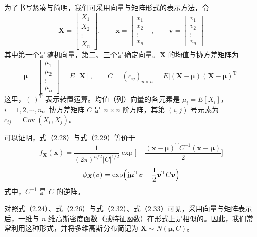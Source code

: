 \documentclass[11pt,openany,UTF8]{ctexbook}
\newcommand{\ju}{\mathrm{j}}                       %
\DeclareMathOperator{\Cov}{Cov}                    %
\newcommand{\bX}{\bm{X}}
\newcommand{\bx}{\bm{x}}
\begin{document}
为了书写紧凑与简明\nobreak，我们可采用向量与矩阵形式的表示方法\nobreak，令
\begin{equation}
\bX=\begin{bmatrix}X_1\\X_2\\\vdots\\X_n\end{bmatrix},\qquad
\bx=\begin{bmatrix}x_1\\x_2\\\vdots\\x_n\end{bmatrix},\qquad
\bm{v}=\begin{bmatrix}v_1\\v_2\\\vdots\\v_n\end{bmatrix}
\label{eq:2.30}
\end{equation}
其中第一个是随机向量\nobreak，第二\nobreak、三个是确定向量\nobreak。$\bX$ 的均值与协方差矩阵为
\begin{equation}
\bm{\mu}=\begin{bmatrix}\mu_1\\\mu_2\\\vdots\\\mu_n\end{bmatrix}=E[\bX],\qquad
C=(c_{ij})_{n\times n}=E\bigl[(\bX-\bm{\mu})(\bX-\bm{\mu})^{\mathrm{T}}\bigr]
\label{eq:2.31}
\end{equation}
这里\nobreak，$(\ )^{\mathrm{T}}$ 表示转置运算\nobreak。均值（列\nobreak）向量的各元素是 $\mu_i=E[X_i]$\nobreak，$i=1,2,\cdots,n$\nobreak。协方差矩阵 $C$ 是 $n\times n$ 阶方阵\nobreak，其第 $(i,j)$ 号元素为 $c_{ij}=\Cov(X_i,X_j)$\nobreak。

可以证明\nobreak，式\nobreak（2.28\nobreak）与式\nobreak（2.29\nobreak）等价于
\begin{equation}
f_{\bX}(\bx)=\frac{1}{(2\pi)^{n/2}\lvert C\rvert^{1/2}}
\exp\Biggl[-\frac{(\bx-\bm{\mu})^{\mathrm{T}}C^{-1}(\bx-\bm{\mu})}{2}\Biggr]
\label{eq:2.32}
\end{equation}
\begin{equation}
\phi_{\bX}(\bm{v})=\exp\Bigl(\ju\bm{\mu}^{\mathrm{T}}\bm{v}-\frac{1}{2}\bm{v}^{\mathrm{T}}C\bm{v}\Bigr)
\label{eq:2.33}
\end{equation}
式中\nobreak，$C^{-1}$ 是 $C$ 的逆阵\nobreak。

对照式\nobreak（2.24\nobreak）\nobreak、式\nobreak（2.26\nobreak）与式\nobreak（2.32\nobreak）\nobreak、式\nobreak（2.33\nobreak）可见\nobreak，采用向量与矩阵表示后\nobreak，一维与 $n$ 维高斯密度函数（或特征函数\nobreak）在形式上是相似的\nobreak。因此\nobreak，我们常常利用这种形式\nobreak，并将多维高斯分布简记为 $\bX\sim N(\bm{\mu},C)$\nobreak。
\end{document}
